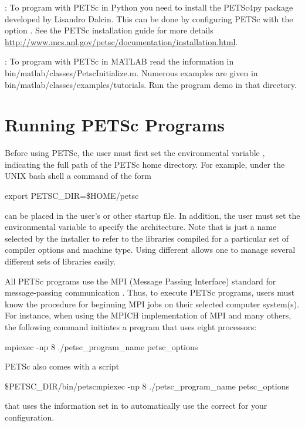 : To program with PETSc in Python you need to install the PETSc4py package developed by
Lisandro Dalcin. This can be done by configuring PETSc with the option . See the PETSc installation guide
for more details \href{http://www.mcs.anl.gov/petsc/documentation/installation.html}{http://www.mcs.anl.gov/petsc/documentation/installation.html}.

: To program with PETSc in MATLAB read the information in bin/matlab/classes/PetscInitialize.m. Numerous examples
are given in bin/matlab/classes/examples/tutorials. Run the program demo in that directory.

\section{Running PETSc Programs}
\label{sec_running}

Before using PETSc, the user must first set the environmental variable
,  indicating the full path of the PETSc home
directory.  For example, under the UNIX bash shell a command of the form
\begin{tabbing}
   export PETSC\_DIR=\$HOME/petsc
\end{tabbing}
 can be placed in the user's  or other startup file.  In addition, the user must set the environmental
variable {} to specify the architecture. Note that
{} is just a name selected by the installer to refer to
the libraries compiled for a particular set of compiler options and
machine type. Using different {} allows one to manage
several different sets of libraries easily.

All PETSc programs use the MPI (Message Passing Interface) standard
for message-passing communication \cite{MPI-final}.  Thus, to execute
PETSc programs, users must know the procedure for beginning MPI jobs
on their selected computer system(s).  For instance, when using the
MPICH implementation of MPI \cite{mpich-web-page} and many others, the following
command initiates a program that uses eight processors:
 
\begin{tabbing}
   mpiexec -np 8 ./petsc\_program\_name petsc\_options
\end{tabbing}

PETSc also comes with a script
\begin{tabbing}
   \${PETSC\_DIR}/bin/petscmpiexec -np 8 ./petsc\_program\_name petsc\_options
\end{tabbing}
that uses the information set in  to
automatically use the correct  for your configuration.

